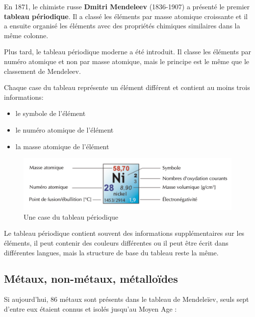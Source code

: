 \documentclass[
  11pt,
  french,
  a4paper,
  openany]{book}
\providecommand{\tightlist}{%
  \setlength{\itemsep}{0pt}\setlength{\parskip}{0pt}}
\begin{document}
En 1871, le chimiste russe \textbf{Dmitri Mendeleev} (1836-1907) a présenté le premier \textbf{tableau périodique}. Il a classé les éléments par masse atomique croissante et il a ensuite organisé les éléments avec des propriétés chimiques similaires dans la même colonne.

Plus tard, le tableau périodique moderne a été introduit. Il classe les éléments par numéro atomique et non par masse atomique, mais le principe est le même que le classement de Mendeleev.

\clearpage

Chaque case du tableau représente un élément différent et contient au moins trois informations:

\begin{itemize}
\tightlist
\item
  le symbole de l'élément
\item
  le numéro atomique de l'élément
\item
  la masse atomique de l'élément
\end{itemize}

\begin{figure}

{\centering \includegraphics[width=0.67\linewidth]{images/tpe-case} 

}

\caption{Une case du tableau périodique}\label{fig:tpe-case}
\end{figure}

Le tableau périodique contient souvent des informations supplémentaires sur les éléments, il peut contenir des couleurs différentes ou il peut être écrit dans différentes langues, mais la structure de base du tableau reste la même.

\hypertarget{muxe9taux-non-muxe9taux-muxe9tallouxefdes}{%
\subsection{Métaux, non-métaux, métalloïdes}\label{muxe9taux-non-muxe9taux-muxe9tallouxefdes}}

Si aujourd'hui, 86 métaux sont présents dans le tableau de Mendeleïev, seuls sept d'entre eux étaient connus et isolés jusqu'au Moyen Age :
\end{document}
